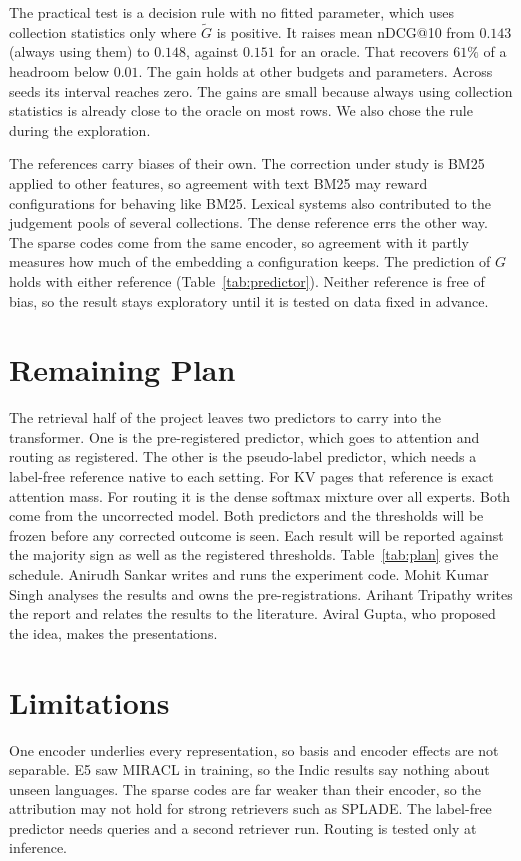 \documentclass[11pt]{article}
\begin{document}
The practical test is a decision rule with no fitted parameter, which uses collection
statistics only where $\tilde{G}$ is positive. It raises mean nDCG@10 from $0.143$ (always
using them) to $0.148$, against $0.151$ for an oracle. That recovers $61\%$ of a headroom
below $0.01$. The gain holds at other budgets and parameters. Across seeds its interval
reaches zero. The gains are small because always using collection statistics is already
close to the oracle on most rows. We also chose the rule during the exploration.

The references carry biases of their own. The correction under study is BM25 applied to
other features, so agreement with text BM25 may reward configurations for behaving like
BM25. Lexical systems also contributed to the judgement pools of several collections. The
dense reference errs the other way. The sparse codes come from the same encoder, so
agreement with it partly measures how much of the embedding a configuration keeps. The
prediction of $G$ holds with either reference (Table~\ref{tab:predictor}). Neither
reference is free of bias, so the result stays exploratory until it is tested on data
fixed in advance.

\section{Remaining Plan}
\label{sec:plan}

The retrieval half of the project leaves two predictors to carry into the transformer.
One is the pre-registered predictor, which goes to attention and routing as registered.
The other is the pseudo-label predictor, which needs a label-free reference native to each
setting. For KV pages that reference is exact attention mass. For routing it is the dense
softmax mixture over all experts. Both come from the uncorrected model. Both predictors and
the thresholds will be frozen before any corrected outcome is seen. Each result will be
reported against the majority sign as well as the registered thresholds. Table~\ref{tab:plan} gives the schedule. Anirudh Sankar writes and
runs the experiment code. Mohit Kumar Singh analyses the results and owns the
pre-registrations. Arihant Tripathy writes the report and relates the results to the
literature. Aviral Gupta, who proposed the idea, makes the presentations.

\section{Limitations}
\label{sec:limitations}

One encoder underlies every representation, so basis and encoder effects are not
separable. E5 saw MIRACL in training, so the Indic results say nothing about unseen
languages. The sparse codes are far weaker than their encoder, so the attribution may not
hold for strong retrievers such as SPLADE. The label-free predictor needs queries and a
second retriever run. Routing is tested only at inference.


\end{document}
